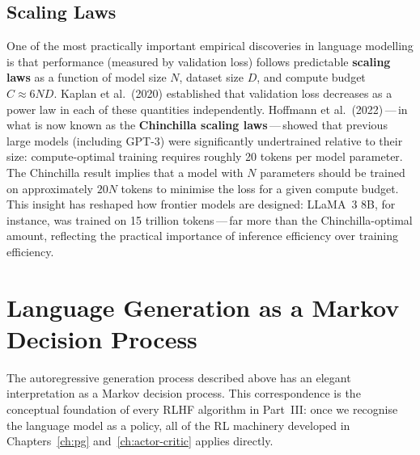 \subsection{Scaling Laws}

One of the most practically important empirical discoveries in language modelling is that performance (measured by validation loss) follows predictable \textbf{scaling laws} as a function of model size $N$, dataset size $D$, and compute budget $C \approx 6ND$. Kaplan et al.\ (2020) established that validation loss decreases as a power law in each of these quantities independently. Hoffmann et al.\ (2022)\,---\,in what is now known as the \textbf{Chinchilla scaling laws}\,---\,showed that previous large models (including GPT-3) were significantly undertrained relative to their size: compute-optimal training requires roughly 20 tokens per model parameter. The Chinchilla result implies that a model with $N$ parameters should be trained on approximately $20N$ tokens to minimise the loss for a given compute budget. This insight has reshaped how frontier models are designed: LLaMA~3 8B, for instance, was trained on 15 trillion tokens\,---\,far more than the Chinchilla-optimal amount, reflecting the practical importance of inference efficiency over training efficiency.

\section{Language Generation as a Markov Decision Process}
\label{sec:lm-mdp}

The autoregressive generation process described above has an elegant interpretation as a Markov decision process. This correspondence is the conceptual foundation of every RLHF algorithm in Part~III: once we recognise the language model as a policy, all of the RL machinery developed in Chapters~\ref{ch:pg} and~\ref{ch:actor-critic} applies directly.

